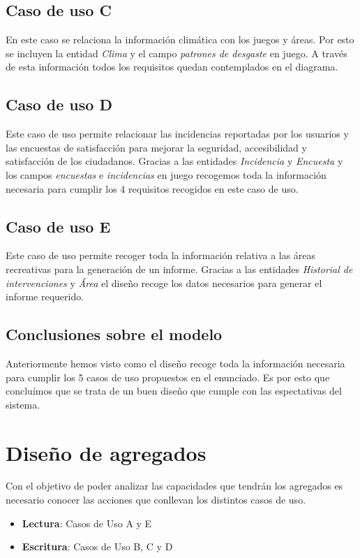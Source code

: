 \documentclass[]{article}
\begin{document}
\subsection{Caso de uso C}
\label{subsec:casoC}
En este caso se relaciona la información climática con los juegos y áreas. Por esto se incluyen la entidad \textit{Clima} y el campo \textit{patrones de desgaste} en juego. A través de esta información todos los requisitos quedan contemplados en el diagrama.

\subsection{Caso de uso D}
\label{subsec:casoD}
Este caso de uso permite relacionar las incidencias reportadas por los usuarios y las encuestas de satisfacción para mejorar la seguridad, accesibilidad y satisfacción de los ciudadanos. Gracias a las entidades \textit{Incidencia} y \textit{Encuesta} y los campos \textit{encuestas} e \textit{incidencias} en juego recogemos toda la información necesaria para cumplir los 4 requisitos recogidos en este caso de uso.

\subsection{Caso de uso E}
\label{subsec:casoE}
Este caso de uso permite recoger toda la información relativa a las áreas recreativas para la generación de un informe. Gracias a las entidades \textit{Historial de intervenciones} y \textit{Área} el diseño recoge los datos necesarios para generar el informe requerido.

\subsection{Conclusiones sobre el modelo}
\label{subsec:conclusiones-modelo}
Anteriormente hemos visto como el diseño recoge toda la información necesaria para cumplir los 5 casos de uso propuestos en el enunciado. Es por esto que concluímos que se trata de un buen diseño que cumple con las espectativas del sistema.

\newpage
\section{Diseño de agregados}
\label{sec:agregados}
Con el objetivo de poder analizar las capacidades que tendrán los agregados es necesario conocer las acciones que conllevan los distintos casos de uso.
\begin{itemize}
    \item \textbf{Lectura}: Casos de Uso A y E
    \item \textbf{Escritura}: Casos de Uso B, C y D
\end{itemize}
\end{document}
